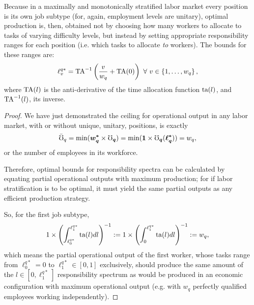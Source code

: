 \documentclass[hidelinks, nonatbib]{elsarticle}
\begin{document}
\begin{lemma}
    Because in a maximally and monotonically stratified labor market every position is its own job subtype (for, again, employment levels are unitary), optimal production is, then, obtained not by choosing how many workers to allocate to tasks of varying difficulty levels, but instead by setting appropriate responsibility ranges for each position (i.e. which tasks to allocate \textit{to} workers). The bounds for these ranges are:
    \begin{gather}
    \ell_{v}^{q*}
    =
    \text{TA}^{-1}\left(
        \frac{v}{w_q}
        +
        \text{TA}(0)
    \right)
    \
    \forall
    \
    v \in 
    \left\{
        1, \dots, w_q
    \right\}
    ,
    \end{gather}
    where $\text{TA}(l)$ is the anti-derivative of the time allocation function $\text{ta}(l)$, and $\text{TA}^{-1}(l)$, its inverse.
    
    \begin{proof}
        
        We have just demonstrated the ceiling for operational output in any labor market, with or without unique, unitary, positions, is exactly 
        \begin{gather}
        \bar{\mho}_{q}
            =
            \min(
                \boldsymbol{w_{q}^{*}}
                \times
                \boldsymbol{\mho_q}
            )
            = 
            \min(
                \boldsymbol{1}
                \times
                \boldsymbol{\mho_q}(
                    \boldsymbol{\ell_{q}^{*}}
                )
            )
            =
            w_q
        ,
        \end{gather}
        or the number of employees in its workforce.
        
        Therefore, optimal bounds for responsibility spectra can be calculated by equating partial operational outputs with maximum production; for if labor stratification is to be optimal, it must yield the same partial outputs as any efficient production strategy.
        
        So, for the first job subtype,
        \begin{gather}
        1 \times \left(
            \int_{\ell_{0}^{q*}}^{\ell_{1}^{q*}}
            \text{ta}(l)
            dl
        \right) ^ {-1}
        :=
        1 \times \left(
            \int_{0}^{\ell_{1}^{q*}}
            \text{ta}(l)
            dl
        \right) ^ {-1}
        :=
        w_q
        ,
        \end{gather}
        which means the partial operational output of the first worker, whose tasks range from $\ell_{0}^{q*} = 0$ to $\ell_{1}^{q*} \in [0,1]$ exclusively, should produce the same amount of the $l \in [0,\ell_{1}^{q*}]$ responsibility spectrum as would be produced in an economic configuration with maximum operational output (e.g. with $w_q$ perfectly qualified employees working independently).
        

\end{proof}
\end{lemma}
\end{document}

